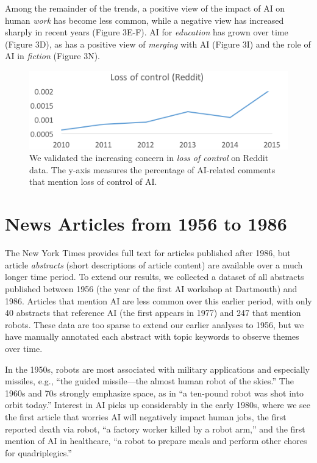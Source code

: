 \documentclass[letterpaper]{article}
\begin{document}
Among the remainder of the trends, a positive view of the impact of AI on human \textit{work} has become less common, while a negative view has increased sharply in recent years (Figure 3E-F). AI for \textit{education} has grown over time (Figure 3D), as has a positive view of \textit{merging} with AI (Figure 3I) and the role of AI in \textit{fiction} (Figure 3N).

\begin{figure}[!t]
\centering
\includegraphics[width=1.0\columnwidth]{ai-reddit2}
\caption{We validated the increasing concern in \textit{loss of control} on Reddit data. The y-axis measures the percentage of AI-related comments that mention loss of control of AI.}
\label{fig:replicate}
\end{figure}

\section{News Articles from 1956 to 1986}

The New York Times provides full text for articles published after 1986, but article \textit{abstracts} (short descriptions of article content) are available over a much longer time period. To extend our results, we collected a dataset of all abstracts published between 1956 (the year of the first AI workshop at Dartmouth) and 1986.  Articles that mention AI are less common over this earlier period, with only 40 abstracts that reference AI (the first appears in 1977) and 247 that mention robots. These data are too sparse to extend our earlier analyses to 1956, but we have manually annotated each abstract with topic keywords to observe themes over time.

In the 1950s, robots are most associated with military applications and especially missiles, e.g., ``the guided missile---the almost human robot of the skies.'' The 1960s and 70s strongly emphasize space, as in ``a ten-pound robot was shot into orbit today.'' Interest in AI picks up considerably in the early 1980s, where we see the first article that worries AI will negatively impact human jobs, the first reported death via robot, ``a factory worker killed by a robot arm,'' and the first mention of AI in healthcare, ``a robot to prepare meals and perform other chores for quadriplegics.''
\end{document}
